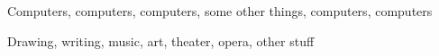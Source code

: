 \documentclass[9pt]{developercv} %
\begin{document}
\begin{tcolorbox}[]
\begin{tcolorbox}[colback=primary, 
			colframe=secondary_dark,
			width=\linewidth,
			]
\begin{minipage}[t]{0.3\textwidth}

	Computers, computers, computers, some other things, computers, computers
\end{minipage}
\hfill
\begin{minipage}[t]{0.3\textwidth}
	\vspace{-\baselineskip} %
	
	
	Drawing, writing, music, art, theater, opera, other stuff
\end{minipage}

\end{tcolorbox}


\end{tcolorbox}




\end{document}
